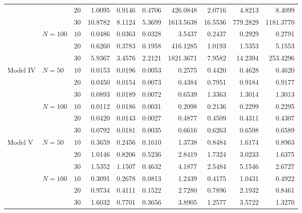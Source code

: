 \begin{table}[H]
\begin{tabular}{l|lr|rrrrrrr}
    &   & $20$ & 1.0095 & 0.9146 & 0.4706 & 426.0848 & 2.0716 & 4.8213 & 8.4099 \\ 
    &   & $30$ & 10.8782 & 8.1124 & 5.3699 & 1613.5638 & 16.5536 & 779.2829 & 1181.3770 \\ 
                \hdashline
    & $N = 100$ & $10$ & 0.0486 & 0.0363 & 0.0328 & 3.5437 & 0.2437 & 0.2929 & 0.2791 \\ 
    &   & $20$ & 0.6260 & 0.3783 & 0.1958 & 416.1285 & 1.0193 & 1.5353 & 5.1553 \\ 
    &   & $30$ & 5.9367 & 3.4576 & 2.2121 & 1821.3671 & 7.9582 & 14.2394 & 253.4296 \\ 
                \hdashline
            \hdashline
  Model IV & $N = 50$ & $10$ & 0.0153 & 0.0196 & 0.0053 & 0.2575 & 0.4420 & 0.4628 & 0.4620 \\ 
    &   & $20$ & 0.0450 & 0.0154 & 0.0073 & 0.4384 & 0.7951 & 0.9184 & 0.9177 \\ 
    &   & $30$ & 0.0893 & 0.0189 & 0.0072 & 0.6539 & 1.3363 & 1.3014 & 1.3013 \\ 
                \hdashline
    & $N = 100$ & $10$ & 0.0112 & 0.0186 & 0.0031 & 0.2098 & 0.2136 & 0.2299 & 0.2295 \\ 
    &   & $20$ & 0.0420 & 0.0143 & 0.0027 & 0.4877 & 0.4509 & 0.4311 & 0.4307 \\ 
    &   & $30$ & 0.0792 & 0.0181 & 0.0035 & 0.6616 & 0.6263 & 0.6598 & 0.6589 \\ 
            \hdashline
            \hdashline
  Model V & $N = 50$ & $10$ & 0.3659 & 0.2456 & 0.1610 & 1.3738 & 0.8484 & 1.6174 & 0.8963 \\ 
    &   & $20$ & 1.0146 & 0.8206 & 0.5236 & 2.8419 & 1.7324 & 3.0233 & 1.6375 \\ 
    &   & $30$ & 1.5352 & 1.1507 & 0.4632 & 4.1877 & 2.5484 & 5.1546 & 2.6727 \\ 
                \hdashline
    & $N = 100$ & $10$ & 0.3091 & 0.2678 & 0.0813 & 1.2439 & 0.4175 & 1.0431 & 0.4922 \\ 
    &   & $20$ & 0.9734 & 0.4111 & 0.1522 & 2.7280 & 0.7896 & 2.1932 & 0.8461 \\ 
    &   & $30$ & 1.6032 & 0.7701 & 0.3656 & 3.8905 & 1.2577 & 3.5722 & 1.3270 \\ 
\end{tabular}
\end{table}
